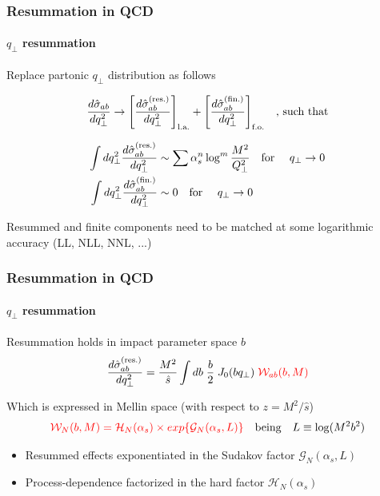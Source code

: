\documentclass[aspectratio=43]{beamer}
\begin{document}
\begin{frame}

	\frametitle{Resummation in QCD}
	\framesubtitle{$q_{\perp}$ resummation}

	Replace partonic $q_{\perp}$ distribution as follows
	
	\begin{equation}
		\frac{d\hat{\sigma}_{ab}}{dq_{\perp}^{2}} \rightarrow 
		\Bigg[ \frac{d\hat{\sigma}^{\textrm{(res.)}}_{ab}}{dq_{\perp}^{2}} \Bigg]_{\textrm{l.a.}} + 
		\Bigg[ \frac{d\hat{\sigma}^{\textrm{(fin.)}}_{ab}}{dq_{\perp}^{2}} \Bigg]_{\textrm{f.o.}} \textrm{\quad, such that} \nonumber
	\end{equation}

	\begin{align}
		\int dq_{\perp}^{2} \frac{d\hat{\sigma}^{\textrm{(res.)}}_{ab}}{dq_{\perp}^{2}} &\sim \sum \alpha_{s}^{n} \log^{m} \frac{M^{2}}{Q_{\perp}^{2}} \textrm{\quad for \quad} q_{\perp} \rightarrow 0 \nonumber \\
		\int dq_{\perp}^{2} \frac{d\hat{\sigma}^{\textrm{(fin.)}}_{ab}}{dq_{\perp}^{2}} &\sim 0 \nonumber \textrm{\quad for \quad} q_{\perp} \rightarrow 0
	\end{align}

	Resummed and finite components need to be matched at some logarithmic accuracy (LL, NLL, NNL, ...)

\end{frame}

\begin{frame}

	\frametitle{Resummation in QCD}
	\framesubtitle{$q_{\perp}$ resummation}
	
	Resummation holds in impact parameter space $b$
	\begin{equation}
		\frac{d\hat{\sigma}_{ab}^{\textrm{(res.)}}}{dq_{\perp}^{2}} = \frac{M^{2}}{\hat{s}} \int db \; \frac{b}{2} \; J_{0}(b q_{\perp}) \; {\color{red} \mathcal{W}_{ab}(b, M)} \nonumber
	\end{equation}
	
	Which is expressed in Mellin space (with respect to $z = M^{2}/\hat{s}$)
	\begin{equation}
		{\color{red} \mathcal{W}_{N}(b, M) = \mathcal{H}_{N}(\alpha_{s}) \times exp\{\mathcal{G}_{N}(\alpha_{s}, L)\}} \quad\textrm{being}\quad L \equiv \log(M^{2}b^{2}) \nonumber
	\end{equation}

	\begin{itemize}
		\item Resummed effects exponentiated in the Sudakov factor {\color{red}$\mathcal{G}_{N}(\alpha_{s}, L)$}
		\item Process-dependence factorized in the hard factor {\color{red}$\mathcal{H}_{N}(\alpha_{s})$}
	\end{itemize}

	
\end{frame}
\end{document}
